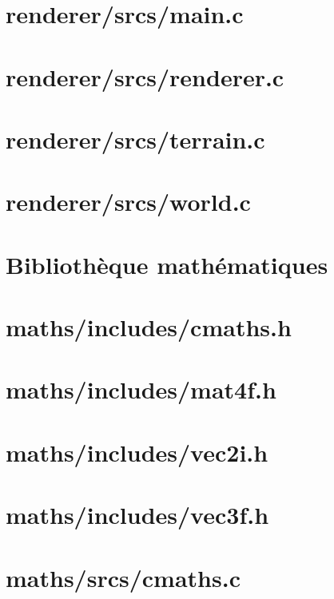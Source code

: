 \documentclass{article}
\begin{document}
\section*{renderer/srcs/main.c}


\section*{renderer/srcs/renderer.c}


\section*{renderer/srcs/terrain.c}


\section*{renderer/srcs/world.c}


\section{Bibliothèque mathématiques}

\section*{maths/includes/cmaths.h}


\section*{maths/includes/mat4f.h}


\section*{maths/includes/vec2i.h}


\section*{maths/includes/vec3f.h}


\section*{maths/srcs/cmaths.c}

\end{document}
